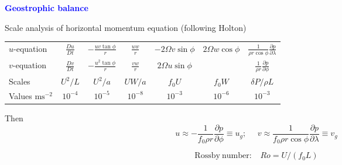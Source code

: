 \documentclass[a4]{seminar}
\newcommand{\B}[1]{\textcolor{blue}{#1}}
\begin{document}
\begin{slide}

\B{\bf Geostrophic balance}

\vspace{3mm}

Scale analysis of horizontal momentum equation (following Holton)

\vspace{1mm}

\begin{center}
\begin{tabular}{|lcccccc|}
\hline
\(u\)-equation
&
\(\frac{Du}{Dt}\)
&
\(-\frac{u v \tan \phi}{r}\)
&
\(\frac{u w}{r}\)
&
\(-2 \Omega v \sin \phi\)
&
\(2 \Omega w \cos \phi\)
&
\(\frac{1}{\rho r \cos \phi} \frac{\partial p}{\partial \lambda}\)
\\
\(v\)-equation
&
\(\frac{Dv}{Dt}\)
&
\(-\frac{u^2 \tan \phi}{r}\)
&
\(\frac{v w}{r}\)
&
\(2 \Omega u \sin \phi\)
&
&
\(\frac{1}{\rho r} \frac{\partial p}{\partial \phi}\)
\\
Scales
&
\(U^2/L\)
&
\(U^2 / a\)
&
\( UW/a\)
&
\(f_0 U\)
&
\(f_0 W\)
&
\(\delta P / \rho L \)
\\
Values \( \mathrm{ms}^{-2}\)
&
\(10^{-4}\)
&
\(10^{-5}\)
&
\(10^{-8}\)
&
\(10^{-3}\)
&
\(10^{-6}\)
&
\(10^{-3}\)
\\
\hline
\end{tabular}
\end{center}

\vspace{3mm}

Then
\begin{displaymath}
u \approx - \frac{1}{f_0 \rho r} \frac{\partial p}{\partial \phi} \equiv u_g;
\ \ \ \ \ \ 
v \approx \frac{1}{f_0 \rho r \cos \phi} \frac{\partial p}{\partial \lambda} \equiv v_g 
\end{displaymath}

\vspace{3mm}

\begin{displaymath}
\mathrm{Rossby\ number:} \ \ \ \ Ro = U/(f_0 L)
\end{displaymath} 


\end{slide}

\end{document}
